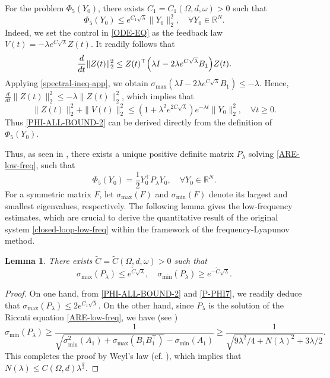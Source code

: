 \documentclass[a4paper]{article}
\newtheorem{lemma}[theorem]{Lemma}
\numberwithin{equation}{section}
\begin{document}
For the problem $\Phi_5(Y_0)$, there exists $C_1=C_1(\Omega,d,\omega)>0$ such that
\begin{equation} \label{PHI-ALL-BOUND-2} 
\Phi_5(Y_0)\le e^{C_1\sqrt{\lambda}}\|Y_0\|_2^2,\quad \forall Y_0\in \mathbb R^N.
\end{equation} 
Indeed, we set the control in \eqref{ODE-EQ} as the feedback law $ V(t)=-\lambda e^{C\sqrt{\lambda}}Z(t)$. It readily follows that
$$\frac{d}{dt}\|Z(t)\|_2^2\le Z(t)^\top\Bigl({\lambda}I-2\lambda e^{C\sqrt{\lambda}}B_1\Bigr)Z(t).$$ 
Applying \eqref{spectral-ineq-app}, we obtain $\sigma_{\max}(\lambda I-2\lambda e^{C\sqrt{\lambda}}B_1)\le -{\lambda}$. Hence, $\frac{d}{dt}\|Z(t)\|_2^2\le -{\lambda}\|Z(t)\|_2^2$, which implies that
$$\|Z(t)\|_2^2+\|V(t)\|_2^2\le (1+\lambda^2e^{2C\sqrt{\lambda}})e^{-{\lambda t}}\|Y_0\|_2^2,\quad\forall t\ge 0. $$
Thus \eqref{PHI-ALL-BOUND-2} can be derived directly from the definition of $\Phi_5( Y_0)$.

Thus, as seen in \cite{LZL}, there exists a unique positive definite matrix $P_\lambda$ solving \eqref{ARE-low-freq}, such that
\begin{equation}\label{P-PHI7}
\Phi_5(Y_0)=\frac 12 Y_0^\top P_\lambda Y_0,\quad \forall Y_0\in \mathbb R^N.
\end{equation}
For a symmetric matrix $F$, let $\sigma_{\max}(F)$ and $\sigma_{\min}(F)$ denote its largest and smallest eigenvalues, respectively. The following lemma gives the low-frequency estimates, which are crucial to derive the quantitative result of the original system \eqref{closed-loop-low-freq} within the framework of the frequency-Lyapunov method.

\begin{lemma}\label{P-eigenva}
There exists $\tilde{C}=\tilde{C}(\Omega,d,\omega)>0$ such that
\begin{equation}\label{P-bounded-new}
\sigma_{\max}(P_\lambda)\le e^{\tilde C\sqrt{\lambda}}, \quad \sigma_{\min}(P_\lambda)\ge e^{-\tilde C\sqrt{\lambda}}.
\end{equation}
\end{lemma}

\begin{proof}
On one hand, from \eqref{PHI-ALL-BOUND-2} and \eqref{P-PHI7}, we readily 
deduce that $\sigma_{\max}(P_\lambda)\le 2e^{C_1\sqrt{\lambda}}$. On the other hand, since $P_\lambda$ is the solution of the Riccati equation \eqref{ARE-low-freq}, we have (see \cite{LZL})
$$\sigma_{\min}(P_\lambda)\ge \frac{1}{\sqrt{\sigma_{\min}^2(A_1)+\sigma_{\max}(B_1B_1^\top)}-\sigma_{\min}(A_1)}\ge \frac{1}{\sqrt{9\lambda^2/4+N(\lambda)^2}+3\lambda/2}.$$
This completes the proof by Weyl's law (cf. \cite[Section 3.6]{TW}), which implies that $N(\lambda)\le C(\Omega,d)\lambda^{\frac d2}$.
\end{proof}
\end{document}
